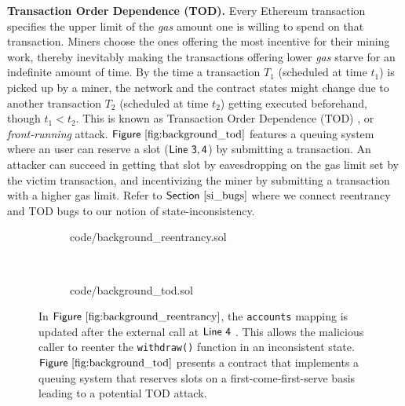 \documentclass[conference, romanappendices]{tex/IEEEtran}
\theoremstyle{bfnote}
\newcommand{\ethereum}{Ethereum}
\newcommand{\reentrancy}{{reentrancy}\xspace}
\newcommand{\si}{{state-inconsistency}\xspace}
\newcommand{\Line}[1]{\ensuremath{\sf Line~ #1}}
\newcommand{\Fig}[1]{\ensuremath{\sf Figure~\ref{#1}}}
\newcommand{\Sect}[1]{\ensuremath{\sf Section~\ref{#1}}}
\begin{document}
\noindent
\textbf{Transaction Order Dependence (TOD).}
Every \ethereum{} transaction specifies the upper limit of the \textit{gas} amount one is willing to spend on that transaction.
Miners choose the ones offering the most incentive for their mining work, thereby inevitably making the transactions offering lower \textit{gas} starve for an indefinite amount of time.
By the time a transaction $T_1$ (scheduled at time $t_1$) is picked up by a miner, the network and the contract states might change due to another transaction $T_2$ (scheduled at time $t_2$) getting executed beforehand, though $t_1 < t_2$.
This is known as Transaction Order Dependence (TOD) \cite{tod-attack}, or \textit{front-running} attack.
\Fig{fig:background_tod}  features a queuing system where an user can reserve a slot (\Line{3, 4}) by submitting a transaction.
An attacker can succeed in getting that slot by eavesdropping on the gas limit set by the victim transaction, and incentivizing the miner by submitting a transaction with a higher gas limit.
Refer to \Sect{si_bugs} where we connect \reentrancy and TOD bugs to our notion of \si.
\vspace{-2mm}
\begin{figure}[t]
	\centering
	\begin{subfigure}[t]{0.49\columnwidth}
			
			{code/background_reentrancy.sol}
			\vspace{-6.5mm}
			\caption{}
			\label{fig:background_reentrancy}
	\end{subfigure}\hfill
	~ 
	\begin{subfigure}[t]{0.45\columnwidth}
		\centering
			
		{code/background_tod.sol}
		\vspace{-2mm}
		\caption{}
		\label{fig:background_tod}
		
	\end{subfigure}
	\vspace{-2.5mm}
	\caption{\small In \Fig{fig:background_reentrancy}, the \texttt{accounts} mapping is updated after the external call at \Line{4} .
	This allows the malicious caller to reenter the \texttt{withdraw()} function in an inconsistent state. 
	\Fig{fig:background_tod} presents a contract that implements a queuing system that reserves slots on a  first-come-first-serve basis leading to a potential TOD attack.}
	\vspace{-6mm}
\end{figure}
\end{document}
